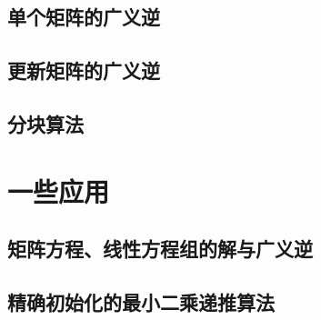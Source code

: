 \subsection{单个矩阵的广义逆}
\label{sub:单个矩阵的广义逆}

\subsection{更新矩阵的广义逆}
\label{sub:更新矩阵的广义逆}

\subsection{分块算法}
\label{sub:分块算法}

\section{一些应用}
\label{sec:一些应用}

\subsection{矩阵方程、线性方程组的解与广义逆}
\label{sub:矩阵方程、线性方程组的解与广义逆}

\subsection{精确初始化的最小二乘递推算法}
\label{sub:精确初始化的最小二乘递推算法}


